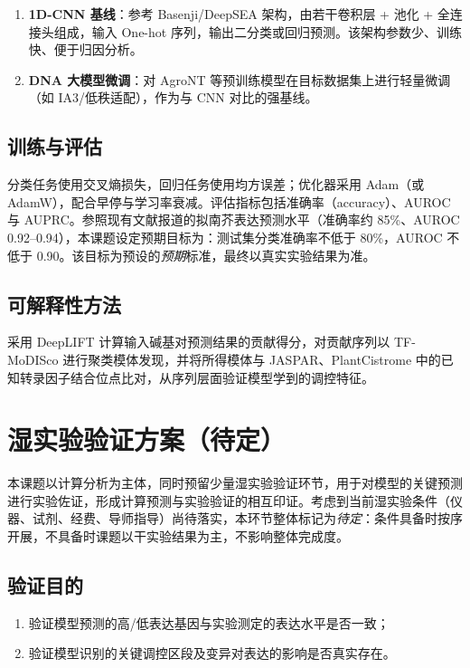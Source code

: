 \documentclass[UTF8,11pt,a4paper]{ctexart}
\begin{document}
\begin{enumerate}
\item \textbf{1D-CNN 基线}：参考 Basenji/DeepSEA 架构，由若干卷积层 + 池化 + 全连接头组成，输入 One-hot 序列，输出二分类或回归预测。该架构参数少、训练快、便于归因分析。
\item \textbf{DNA 大模型微调}：对 AgroNT\cite{mendoza2024} 等预训练模型在目标数据集上进行轻量微调（如 IA3/低秩适配），作为与 CNN 对比的强基线。
\end{enumerate}

\subsection{训练与评估}
\label{sec:method-eval}

分类任务使用交叉熵损失，回归任务使用均方误差；优化器采用 Adam（或 AdamW），配合早停与学习率衰减。评估指标包括准确率（accuracy）、AUROC 与 AUPRC。参照现有文献报道的拟南芥表达预测水平（准确率约 85\%、AUROC 0.92--0.94\cite{peleke2024}），本课题设定预期目标为：测试集分类准确率不低于 80\%，AUROC 不低于 0.90。该目标为预设的\emph{预期}标准，最终以真实实验结果为准。

\subsection{可解释性方法}
\label{sec:method-interp}

采用 DeepLIFT\cite{shrikumar2017} 计算输入碱基对预测结果的贡献得分，对贡献序列以 TF-MoDISco 进行聚类模体发现，并将所得模体与 JASPAR、PlantCistrome 中的已知转录因子结合位点比对，从序列层面验证模型学到的调控特征。

\section{湿实验验证方案（待定）}
\label{sec:wetlab}

本课题以计算分析为主体，同时预留少量湿实验验证环节，用于对模型的关键预测进行实验佐证，形成计算预测与实验验证的相互印证。考虑到当前湿实验条件（仪器、试剂、经费、导师指导）尚待落实，本环节整体标记为\emph{待定}：条件具备时按序开展，不具备时课题以干实验结果为主，不影响整体完成度。

\subsection{验证目的}
\label{sec:wetlab-goal}

\begin{enumerate}
\item 验证模型预测的高/低表达基因与实验测定的表达水平是否一致；
\item 验证模型识别的关键调控区段及变异对表达的影响是否真实存在。
\end{enumerate}
\end{document}
